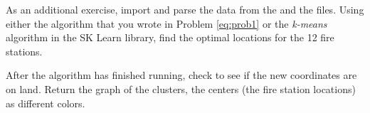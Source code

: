 As an additional exercise, import and parse the data from the  and the  files.
Using either the algorithm that you wrote in Problem \ref{eq:prob1} or the \emph{k-means} algorithm in the SK Learn library, find the optimal locations for the 12 fire stations.
	
After the algorithm has finished running, check to see if the new coordinates are on land.
Return the graph of the clusters, the centers (the fire station locations) as different colors.

